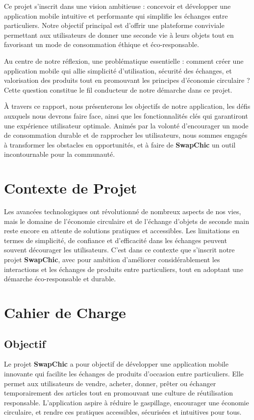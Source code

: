 \documentclass[12pt,a4paper]{report}
\begin{document}
	Ce projet s'inscrit dans une vision ambitieuse : concevoir et développer une application mobile intuitive et performante qui simplifie les échanges entre particuliers. Notre objectif principal est d'offrir une plateforme conviviale permettant aux utilisateurs de donner une seconde vie à leurs objets tout en favorisant un mode de consommation éthique et éco-responsable.
	
	Au centre de notre réflexion, une problématique essentielle : comment créer une application mobile qui allie simplicité d'utilisation, sécurité des échanges, et valorisation des produits tout en promouvant les principes d'économie circulaire ? Cette question constitue le fil conducteur de notre démarche dans ce projet.
	
	À travers ce rapport, nous présenterons les objectifs de notre application, les défis auxquels nous devrons faire face, ainsi que les fonctionnalités clés qui garantiront une expérience utilisateur optimale. Animés par la volonté d'encourager un mode de consommation durable et de rapprocher les utilisateurs, nous sommes engagés à transformer les obstacles en opportunités, et à faire de \textbf{SwapChic} un outil incontournable pour la communauté.
	
	\section{Contexte de Projet}
	Les avancées technologiques ont révolutionné de nombreux aspects de nos vies, mais le domaine de l'économie circulaire et de l'échange d'objets de seconde main reste encore en attente de solutions pratiques et accessibles. Les limitations en termes de simplicité, de confiance et d'efficacité dans les échanges peuvent souvent décourager les utilisateurs. C'est dans ce contexte que s'inscrit notre projet \textbf{SwapChic}, avec pour ambition d'améliorer considérablement les interactions et les échanges de produits entre particuliers, tout en adoptant une démarche éco-responsable et durable.
	
	\section{Cahier de Charge}
	\subsection{Objectif}
	Le projet \textbf{SwapChic} a pour objectif de développer une application mobile innovante qui facilite les échanges de produits d'occasion entre particuliers. Elle permet aux utilisateurs de vendre, acheter, donner, prêter ou échanger temporairement des articles tout en promouvant une culture de réutilisation responsable. L'application aspire à réduire le gaspillage, encourager une économie circulaire, et rendre ces pratiques accessibles, sécurisées et intuitives pour tous.
	
\end{document}
